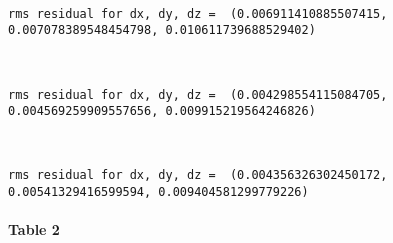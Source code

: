 \documentclass[11pt]{article}
\begin{document}
    \begin{center}
    \end{center}
    { \hspace*{\fill} \\}
    
    \begin{Verbatim}[commandchars=\\\{\}]
rms residual for dx, dy, dz =  (0.006911410885507415, 0.007078389548454798, 0.010611739688529402)

    \end{Verbatim}

    \begin{center}
    \end{center}
    { \hspace*{\fill} \\}
    
    \begin{Verbatim}[commandchars=\\\{\}]
rms residual for dx, dy, dz =  (0.004298554115084705, 0.004569259909557656, 0.009915219564246826)

    \end{Verbatim}

    \begin{center}
    \end{center}
    { \hspace*{\fill} \\}
    
    \begin{Verbatim}[commandchars=\\\{\}]
rms residual for dx, dy, dz =  (0.004356326302450172, 0.00541329416599594, 0.009404581299779226)

    \end{Verbatim}

    \paragraph{Table 2}\label{table-2}
\end{document}
